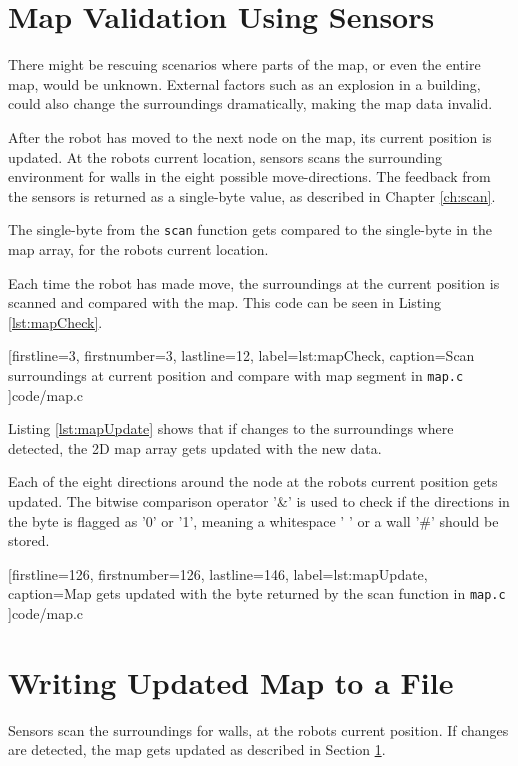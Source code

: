 \section{Map Validation Using Sensors}
\label{sec:map_check} %
There might be rescuing scenarios where parts of the map, or even the entire map, would be unknown.
External factors such as an explosion in a building, could also change the surroundings dramatically, making the map data invalid.

After the robot has moved to the next node on the map, its current position is updated.
At the robots current location, sensors scans the surrounding environment for walls in the eight possible move-directions.
The feedback from the sensors is returned as a single-byte value, as described in Chapter \ref{ch:scan}.

The single-byte from the {\tt scan} function gets compared to the single-byte in the map array, for the robots current location.


Each time the robot has made move, the surroundings at the current position is scanned and compared with the map.
This code can be seen in Listing \ref{lst:mapCheck}.
 

[firstline=3,			%
firstnumber=3,		%
lastline=12,			%
label=lst:mapCheck,	%
caption={Scan surroundings at current position and compare with map segment in {\tt map.c}}
]{code/map.c}

Listing \ref{lst:mapUpdate} shows that if changes to the surroundings where
detected, the 2D map array gets updated with the new data. 

Each of the eight directions around the node at the robots current position gets updated.
The bitwise comparison operator '\&' is used to check if the directions in the byte is flagged as '0' or '1',
meaning a whitespace ' ' or a wall '\#' should be stored.


[firstline=126,			%
firstnumber=126,		%
lastline=146,			%
label=lst:mapUpdate,	%
caption={Map gets updated with the byte returned by the scan function in {\tt map.c}}
]{code/map.c}

\newpage
\section{Writing Updated Map to a File}
\label{sec:map_save} %
Sensors scan the surroundings for walls, at the robots current position.
If changes are detected, the map gets updated as described in Section \ref{sec:map_check}.

